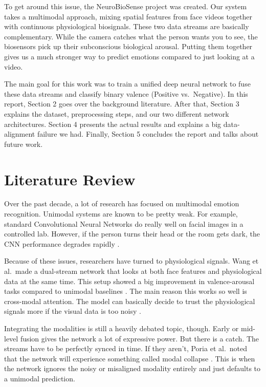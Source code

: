 \documentclass[12pt, a4paper]{article}
\begin{document}
To get around this issue, the NeuroBioSense project was created. Our system takes a multimodal approach, mixing spatial features from face videos together with continuous physiological biosignals. These two data streams are basically complementary. While the camera catches what the person wants you to see, the biosensors pick up their subconscious biological arousal. Putting them together gives us a much stronger way to predict emotions compared to just looking at a video.

The main goal for this work was to train a unified deep neural network to fuse these data streams and classify binary valence (Positive vs.\ Negative). In this report, Section 2 goes over the background literature. After that, Section 3 explains the dataset, preprocessing steps, and our two different network architectures. Section 4 presents the actual results and explains a big data-alignment failure we had. Finally, Section 5 concludes the report and talks about future work.

\section{Literature Review}

Over the past decade, a lot of research has focused on multimodal emotion recognition. Unimodal systems are known to be pretty weak. For example, standard Convolutional Neural Networks do really well on facial images in a controlled lab. However, if the person turns their head or the room gets dark, the CNN performance degrades rapidly \cite{ref1, ref_new1}.

Because of these issues, researchers have turned to physiological signals. Wang et al.\ made a dual-stream network that looks at both face features and physiological data at the same time. This setup showed a big improvement in valence-arousal tasks compared to unimodal baselines \cite{ref2}. The main reason this works so well is cross-modal attention. The model can basically decide to trust the physiological signals more if the visual data is too noisy \cite{ref3}.

Integrating the modalities is still a heavily debated topic, though. Early or mid-level fusion gives the network a lot of expressive power. But there is a catch. The streams have to be perfectly synced in time. If they aren't, Poria et al.\ noted that the network will experience something called modal collapse \cite{ref_new2}. This is when the network ignores the noisy or misaligned modality entirely and just defaults to a unimodal prediction.
\end{document}

